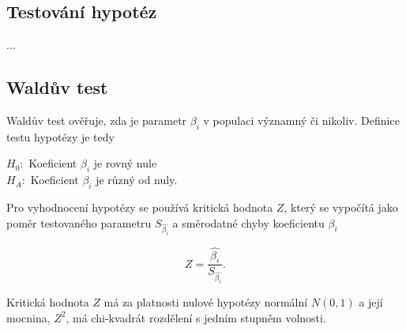 {\color{red}
\subsection{Testování hypotéz}
...
}

\subsection{Waldův test}
Waldův test ověřuje, zda je parametr $\beta_i$ v populaci významný či nikoliv. Definice testu hypotézy je tedy

$H_0:$ Koeficient $\beta_i$ je rovný nule \\
$H_A:$ Koeficient $\beta_i$ je různý od nuly.

Pro vyhodnocení hypotézy se používá kritická hodnota $Z$, který se vypočítá jako poměr testovaného parametru $S_{\hat{\beta_i}}$
a směrodatné chyby koeficientu $\beta_i$

\begin{equation}
    Z = \frac{\hat{\beta_i}}{S_{\hat{\beta_i}}}.
\end{equation}

Kritická hodnota $Z$ má za platnosti nulové hypotézy normální $N(0, 1)$ a její mocnina, $Z^2$, má chi-kvadrát rozdělení s jedním stupněm volnosti.\cite{Kleinbaum2010}
